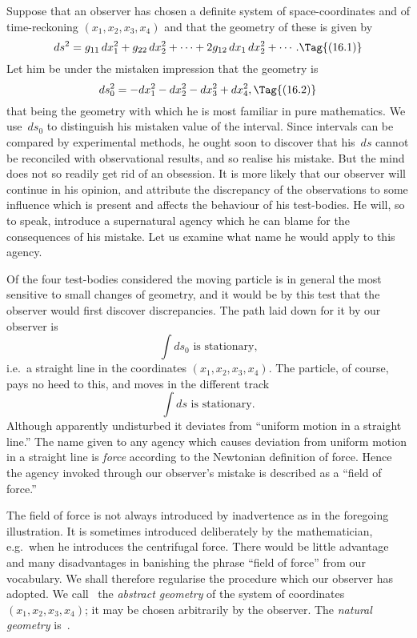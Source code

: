 \documentclass[12pt]{book}
\begin{document}
%

Suppose that an observer has chosen a definite system of space-coordinates
and of time-reckoning $(x_{1}, x_{2}, x_{3}, x_{4})$ and that the geometry of these is given by
\[
ds^{2} = g_{11}\, dx_{1}^{2} + g_{22}\, dx_{2}^{2} + \dots + 2g_{12}\, dx_{1}\, dx_{2}^{2} + \cdots.
\Tag{(16.1)}
\]
Let him be under the mistaken impression that the geometry is
\[
ds_{0}^{2} = -dx_{1}^{2} - dx_{2}^{2} - dx_{3}^{2} + dx_{4}^{2},
\Tag{(16.2)}
\]
that being the geometry with which he is most familiar in pure mathematics.
We use~$ds_{0}$ to distinguish his mistaken value of the interval. Since intervals
can be compared by experimental methods, he ought soon to discover that his~$ds$
cannot be reconciled with observational results, and so realise his mistake.
But the mind does not so readily get rid of an obsession. It is more likely
that our observer will continue in his opinion, and attribute the discrepancy
of the observations to some influence which is present and affects the behaviour
of his test-bodies. He will, so to speak, introduce a supernatural agency
which he can blame for the consequences of his mistake. Let us examine
what name he would apply to this agency.

Of the four test-bodies considered the moving particle is in general the
most sensitive to small changes of geometry, and it would be by this test that
the observer would first discover discrepancies. The path laid down for it by
our observer is
\[
\int ds_{0} \text{ is stationary,}
\]
i.e.\ a straight line in the coordinates $(x_{1}, x_{2}, x_{3}, x_{4})$. The particle, of course,
pays no heed to this, and moves in the different track
\[
\int ds \text{ is stationary.}
\]
Although apparently undisturbed it deviates from ``uniform motion in a
straight line.'' The name given to any agency which causes deviation from
uniform motion in a straight line is \emph{force} according to the Newtonian definition
of force. Hence the agency invoked through our observer's mistake is described
as a ``field of force.''

The field of force is not always introduced by inadvertence as in the foregoing
illustration. It is sometimes introduced deliberately by the mathematician,
e.g.\ when he introduces the centrifugal force. There would be little
%
advantage and many disadvantages in banishing the phrase ``field of force''
from our vocabulary. We shall therefore regularise the procedure which our
observer has adopted. We call~ the \emph{abstract geometry} of the system of
coordinates $(x_{1}, x_{2}, x_{3}, x_{4})$; it may be chosen arbitrarily by the observer. The
%
\emph{natural geometry} is~.
\end{document}
